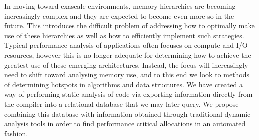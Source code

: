 In moving toward exascale environments, memory hierarchies are becoming increasingly complex and they are expected to become even more so in the future.
This introduces the difficult problem of addressing how to optimally make use of these hierarchies as well as how to efficiently implement such strategies.
Typical performance analysis of applications often focuses on compute and I/O resources, however this is no longer adequate for determining how to achieve the greatest use of these emerging architectures.
Instead, the focus will increasingly need to shift toward analysing memory use, and to this end we look to methods of determining hotspots in algorithms and data structures.
We have created a way of performing static analysis of code via exporting information directly from the compiler into a relational database that we may later query.
We propose combining this database with information obtained through traditional dynamic analysis tools in order to find performance critical allocations in an automated fashion.
